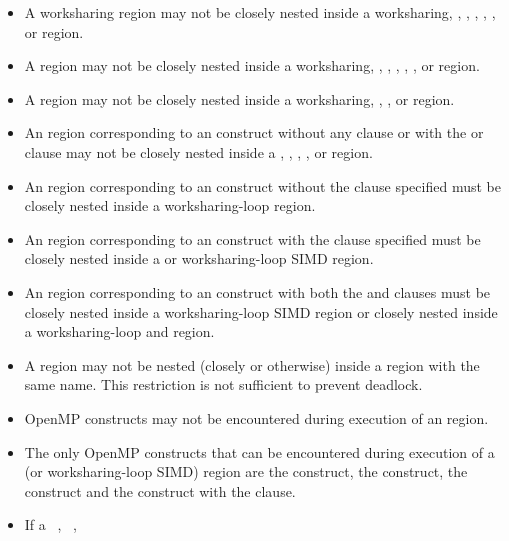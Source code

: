 \begin{itemize}
\item A worksharing region may not be closely nested inside a worksharing,
      , , , ,
      , or  region.
\item A  region may not be closely nested inside a worksharing,
      , , , ,
      , or  region.
\item A  region may not be closely nested inside a worksharing,
      , , or  region.
\item An  region corresponding to an  construct
      without any clause or with the  or  clause 
      may not be closely nested inside a , , 
      , , or  region.
\item An  region corresponding to an  construct 
      without the  clause specified must be closely nested inside 
      a worksharing-loop region.
\item An  region corresponding to an  construct 
      with the  clause specified must be closely nested inside a 
       or worksharing-loop SIMD region.
\item An  region corresponding to an  construct 
      with both the  and  clauses must be closely 
      nested inside a worksharing-loop SIMD region or closely nested inside 
      a worksharing-loop and  region.
\item A  region may not be nested (closely or otherwise) inside 
      a  region with the same name. This restriction is not 
      sufficient to prevent deadlock.
\item OpenMP constructs may not be encountered during execution of an
       region.
\item The only OpenMP constructs that can be encountered during execution of a
       (or worksharing-loop SIMD) region are the  construct,
      the  construct, the  construct and the  
      construct with the  clause.
\item If a ~, ~,

\end{itemize}
